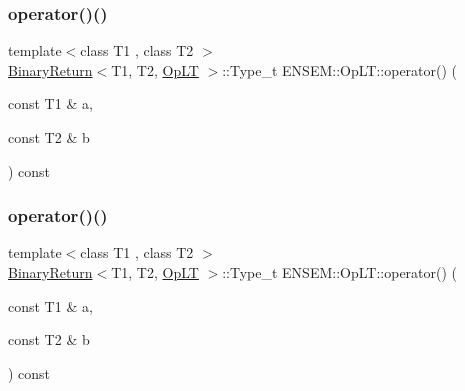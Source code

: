 \subsubsection{\texorpdfstring{operator()()}{operator()()}\hspace{0.1cm}{\footnotesize\ttfamily [1/3]}}
{\footnotesize\ttfamily template$<$class T1 , class T2 $>$ \\
\mbox{\hyperlink{structENSEM_1_1BinaryReturn}{Binary\+Return}}$<$T1, T2, \mbox{\hyperlink{structENSEM_1_1OpLT}{Op\+LT}} $>$\+::Type\+\_\+t E\+N\+S\+E\+M\+::\+Op\+L\+T\+::operator() (\begin{DoxyParamCaption}\item[{const T1 \&}]{a,  }\item[{const T2 \&}]{b }\end{DoxyParamCaption}) const\hspace{0.3cm}{\ttfamily [inline]}}

\mbox{\label{structENSEM_1_1OpLT_af52d16f9a101e3c95c415857a2da4425}} 
\subsubsection{\texorpdfstring{operator()()}{operator()()}\hspace{0.1cm}{\footnotesize\ttfamily [2/3]}}
{\footnotesize\ttfamily template$<$class T1 , class T2 $>$ \\
\mbox{\hyperlink{structENSEM_1_1BinaryReturn}{Binary\+Return}}$<$T1, T2, \mbox{\hyperlink{structENSEM_1_1OpLT}{Op\+LT}} $>$\+::Type\+\_\+t E\+N\+S\+E\+M\+::\+Op\+L\+T\+::operator() (\begin{DoxyParamCaption}\item[{const T1 \&}]{a,  }\item[{const T2 \&}]{b }\end{DoxyParamCaption}) const\hspace{0.3cm}{\ttfamily [inline]}}

\mbox{\label{structENSEM_1_1OpLT_af52d16f9a101e3c95c415857a2da4425}} 
